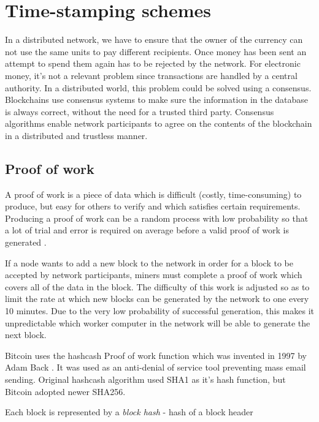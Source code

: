\section{Time-stamping schemes}
\label{timestamping}
In a distributed network, we have to ensure that the owner of the currency can not use the same units to pay different recipients. Once money has been sent an attempt to spend them again has to be rejected by the network. For electronic money, it's not a relevant problem since transactions are handled by a central authority. In a distributed world, this problem could be solved using a consensus. Blockchains use consensus systems to make sure the information in the database is always correct, without the need for a trusted third party. Consensus algorithms enable network participants to agree on the contents of the blockchain in a distributed and trustless manner. 

\subsection{Proof of work}
A proof of work is a piece of data which is difficult (costly, time-consuming) to produce, but easy for others to verify and which satisfies certain requirements. Producing a proof of work can be a random process with low probability so that a lot of trial and error is required on average before a valid proof of work is generated \cite{proof_of_work}. 

If a node wants to add a new block to the network in order for a block to be accepted by network participants, miners must complete a proof of work which covers all of the data in the block. The difficulty of this work is adjusted so as to limit the rate at which new blocks can be generated by the network to one every 10 minutes. Due to the very low probability of successful generation, this makes it unpredictable which worker computer in the network will be able to generate the next block. 

Bitcoin uses the hashcash Proof of work function which was invented in 1997 by Adam Back \cite{Hashcash}. It was used as an anti-denial of service tool preventing mass email sending. Original hashcash algorithm used SHA1 as it's hash function, but Bitcoin adopted newer SHA256. 

Each block is represented by a \emph{block hash} - hash of a block header

